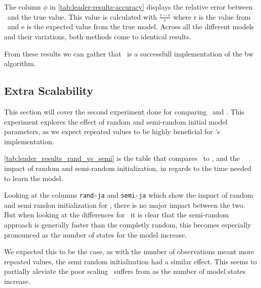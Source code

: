 The column $\phi$ in \autoref{tab:leader-results-accuracy} displays the relative error between \Cupaal\ and the true value.
This value is calculated with $\frac{r-e}{e}$ where r is the value from \Cupaal\ and e is the expected value from the true model.
Across all the different models and their variations, both methods come to identical results.




From these results we can gather that \Cupaal\ is a successfull implementation of the \gls{bw} algorithm.



\subsection{Extra Scalability}\label{subsec:extra_scalability}
This section will cover the second experiment done for comparing \Cupaal\ and \Jajapy.
This experiment explores the effect of random and semi-random initial model parameters, as we expect repeated values to be highly beneficial for \Cupaal's implementation.

\autoref{tab:leader_results_rand_vs_semi} is the table that compares \Cupaal\ to \Jajapy, and the impact of random and semi-random initialization, in regards to the time needed to learn the model.

Looking at the columns \texttt{rand-ja} and \texttt{semi-ja} which show the impact of random and semi randon initialization for \Jajapy, there is no major impact between the two.
But when looking at the differences for \Cupaal\ it is clear that the semi-random approach is generally faster than the completly random, this becomes especially pronounced as the number of states for the model increase.

We expected this to be the case, as with the number of observations meant more repeated values, the semi random initialization had a similar effect.
This seems to partially aleviate the poor scaling \Cupaal\ suffers from as the number of model states increase.

